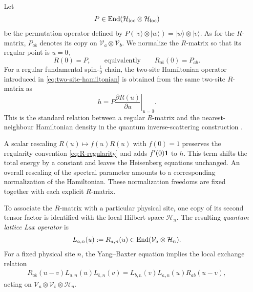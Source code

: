 Let
\begin{equation}
P\in\operatorname{End}(\mathcal H_{\rm loc}\otimes\mathcal H_{\rm loc})
\label{eq:local-permutation-operator}
\end{equation}
be the permutation operator defined by
$P(|v\rangle\otimes|w\rangle)=|w\rangle\otimes|v\rangle$.
As for the $R$-matrix, $P_{ab}$ denotes its copy on
$\mathcal V_a\otimes\mathcal V_b$.  We normalize the $R$-matrix so that its
regular point is $u=0$,
\begin{equation}
R(0)=P,
\qquad\text{equivalently}\qquad
R_{ab}(0)=P_{ab}.
\label{eq:R-regularity}
\end{equation}
For a regular fundamental spin-$\tfrac12$ chain, the two-site Hamiltonian
operator introduced in \eqref{eq:two-site-hamiltonian} is obtained from the
same two-site $R$-matrix as
\begin{equation}
h
=
P\left.\frac{\partial R(u)}{\partial u}\right|_{u=0}.
\label{eq:h-from-R}
\end{equation}
This is the standard relation between a regular $R$-matrix and the
nearest-neighbour Hamiltonian density in the quantum inverse-scattering
construction \cite{Faddeev1996,deLeeuwPribytokRyan2019}.

A scalar rescaling $R(u)\mapsto f(u)R(u)$ with $f(0)=1$ preserves the
regularity convention \eqref{eq:R-regularity} and adds
$f'(0)\mathbf{1}$ to $h$.  This term shifts the total energy by a constant and leaves
the Heisenberg equations unchanged.  An overall rescaling of the spectral
parameter amounts to a corresponding normalization of the Hamiltonian.
These normalization freedoms are fixed together with each explicit
$R$-matrix.

To associate the $R$-matrix with a particular physical site, one copy of its
second tensor factor is identified with the local Hilbert space
$\mathcal H_n$.  The resulting \emph{quantum lattice Lax operator} is
\begin{equation}
L_{a,n}(u):=R_{a,n}(u)
\in\operatorname{End}(\mathcal V_a\otimes\mathcal H_n).
\label{eq:lattice-Lax-operator}
\end{equation}
For a fixed physical site $n$, the Yang--Baxter equation implies the local
exchange relation
\begin{align}
R_{ab}(u-v)L_{a,n}(u)L_{b,n}(v)
=
L_{b,n}(v)L_{a,n}(u)R_{ab}(u-v),
\label{eq:RLL-relation}
\end{align}
acting on $\mathcal V_a\otimes\mathcal V_b\otimes\mathcal H_n$.

